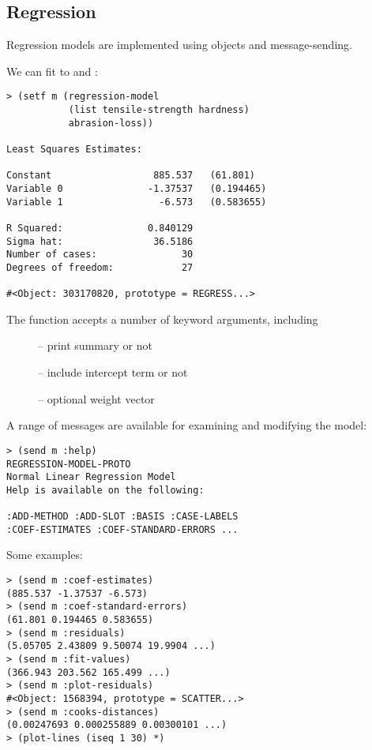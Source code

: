 \begin{slide}{}
\section{Regression}
Regression models are implemented using objects and
message-sending.

We can fit  to  and
:
{\Large
\begin{verbatim}
> (setf m (regression-model
           (list tensile-strength hardness)
           abrasion-loss))

Least Squares Estimates:

Constant                  885.537   (61.801)
Variable 0               -1.37537   (0.194465)
Variable 1                 -6.573   (0.583655)

R Squared:               0.840129
Sigma hat:                36.5186
Number of cases:               30
Degrees of freedom:            27

#<Object: 303170820, prototype = REGRESS...>
\end{verbatim}}
\end{slide}

\begin{slide}{}
The  function accepts a number of keyword
arguments, including
\begin{description}
\item[]  -- print summary or not
\item[]  -- include intercept term or not
\item[]  -- optional weight vector
\end{description}
A range of messages are available for examining and modifying the
model:
{\Large
\begin{verbatim}
> (send m :help)
REGRESSION-MODEL-PROTO
Normal Linear Regression Model
Help is available on the following:

:ADD-METHOD :ADD-SLOT :BASIS :CASE-LABELS
:COEF-ESTIMATES :COEF-STANDARD-ERRORS ...
\end{verbatim}}
\end{slide}

\begin{slide}{}
Some examples:
{\Large
\begin{verbatim}
> (send m :coef-estimates)
(885.537 -1.37537 -6.573)
> (send m :coef-standard-errors)
(61.801 0.194465 0.583655)
> (send m :residuals)
(5.05705 2.43809 9.50074 19.9904 ...)
> (send m :fit-values)
(366.943 203.562 165.499 ...)
> (send m :plot-residuals)
#<Object: 1568394, prototype = SCATTER...>
> (send m :cooks-distances)
(0.00247693 0.000255889 0.00300101 ...)
> (plot-lines (iseq 1 30) *)
\end{verbatim}}
\end{slide}

